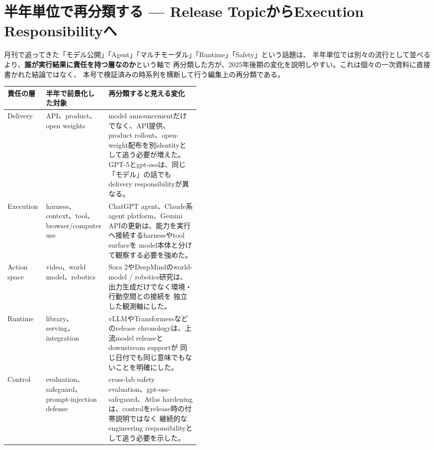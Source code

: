 \section{半年単位で再分類する — Release TopicからExecution Responsibilityへ}
\label{analysis:half-year-reclassification}

月刊で追ってきた「モデル公開」「Agent」「マルチモーダル」「Runtime」「Safety」という話題は、
半年単位では別々の流行として並べるより、\textbf{誰が実行結果に責任を持つ層なのか}という軸で
再分類した方が、2025年後期の変化を説明しやすい。これは個々の一次資料に直接書かれた結論ではなく、
本号で検証済みの時系列を横断して行う編集上の再分類である。

\begin{center}
\small
\renewcommand{\arraystretch}{1.18}
\begin{tabularx}{\linewidth}{@{}p{0.20\linewidth}p{0.25\linewidth}X@{}}
\toprule
責任の層 & 半年で前景化した対象 & 再分類すると見える変化 \\
\midrule
Delivery & API、product、open weights &
model announcementだけでなく、API提供、product rollout、open-weight配布を別identityとして追う必要が増えた。
GPT-5とgpt-ossは、同じ「モデル」の話でもdelivery responsibilityが異なる。 \cite{src-05738f6c55b7,src-964121647555,src-12865e8612c7,src-1c46fdf17c79} \\
Execution & harness、context、tool、browser/computer use &
ChatGPT agent、Claude系agent platform、Gemini APIの更新は、能力を実行へ接続するharnessやtool surfaceを
model本体と分けて観察する必要を強めた。 \cite{src-b074ccdb2d9e,src-7a7213b68631,src-f6aa679babd7,src-a24fd97eb3d0} \\
Action space & video、world model、robotics &
Sora 2やDeepMindのworld-model / robotics研究は、出力生成だけでなく環境・行動空間との接続を
独立した観測軸にした。 \cite{src-661a3476d3d5,src-8530f5b0e216,src-dd5d9b8662f3} \\
Runtime & library、serving、integration &
vLLMやTransformersなどのrelease chronologyは、上流model releaseとdownstream supportが
同じ日付でも同じ意味でもないことを明確にした。 \cite{src-43eaa2f12960,src-58ef6e84aa65,src-455a78bc36fa,src-2595cdd4fabc} \\
Control & evaluation、safeguard、prompt-injection defense &
cross-lab safety evaluation、gpt-oss-safeguard、Atlas hardeningは、controlをrelease時の付帯説明ではなく
継続的なengineering responsibilityとして追う必要を示した。 \cite{src-ad13fe7d3321,src-2081c76ea2b4,src-0ad9fbef8c87} \\
\bottomrule
\end{tabularx}
\renewcommand{\arraystretch}{1.0}
\end{center}
\normalsize

